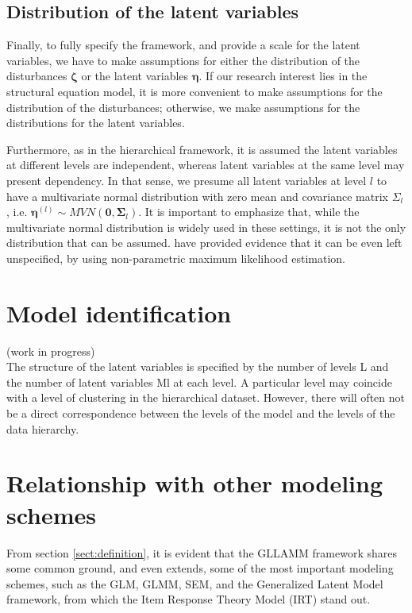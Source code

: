 \subsection{Distribution of the latent variables} \label{s_sect:dist_lv}
Finally, to fully specify the framework, and provide a scale for the latent variables, we have to make assumptions for either the distribution of the disturbances $\pmb{\zeta}$ or the latent variables $\pmb{\eta}$. If our research interest lies in the structural equation model, it is more convenient to make assumptions for the distribution of the disturbances; otherwise, we make assumptions for the distributions for the latent variables. 

Furthermore, as in the hierarchical framework, it is assumed the latent variables at different levels are independent, whereas latent variables at the same level may present dependency. In that sense, we presume all latent variables at level $l$ to have a multivariate normal distribution with zero mean and covariance matrix $\Sigma_{l}$, i.e. $\pmb{\eta}^{(l)} \sim MVN(\mathbf{0}, \pmb{\Sigma}_{l})$. It is important to emphasize that, while the multivariate normal distribution is widely used in these settings, it is not the only distribution that can be assumed. \citet{Rabe_et_al_2003a} have provided evidence that it can be even left unspecified, by using non-parametric maximum likelihood estimation.



\section{Model identification} \label{sect:identification}
{\color{red}(work in progress) \\
The structure of the latent variables is specified by the number of levels L and the number of latent variables Ml at each level. A particular level may coincide with a level of clustering in the hierarchical dataset. However, there will often not be a direct correspondence between the levels of the model and the levels of the data hierarchy.

}


\section{Relationship with other modeling schemes}

From section \ref{sect:definition}, it is evident that the GLLAMM framework shares some common ground, and even extends, some of the most important modeling schemes, such as the GLM, GLMM, SEM, and the Generalized Latent Model framework, from which the Item Response Theory Model (IRT) stand out.

